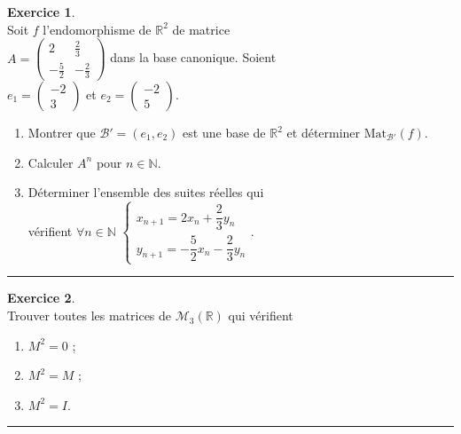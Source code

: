\documentclass[a4paper,10pt]{article}
\theoremstyle{definition}
\theoremstyle{definition}
\newtheorem{exo}{Exercice}
\newcommand{\R}{\mathbb{R}}
\newcommand{\N}{\mathbb{N}}
\begin{document}
\begin{minipage}{1\linewidth}
\begin{minipage}[t]{0.48\linewidth}
		\begin{exo}\quad\\
			Soit $f$ l'endomorphisme de $\R^2$ de matrice\\[0.25cm] $A=\begin{pmatrix} 2&\frac 23\\[0.25cm]
			-\frac 52&-\frac 23 \end{pmatrix}$ dans la base canonique. Soient\\[0.25cm] 
			$e_1 = \begin{pmatrix} -2 \\ 3\end{pmatrix}$
			et $e_2 = \begin{pmatrix} -2 \\ 5 \end{pmatrix}$.
			\begin{enumerate}
				\item Montrer que $\mathcal{B}'= (e_1, e_2)$ est une base de $\R^2$ et déterminer 
				$\text{Mat}_{\mathcal{B}'}(f)$.
				\item Calculer $A^n$ pour $n \in \N$.
				\item Déterminer l'ensemble des suites réelles qui \\[0.25cm]vérifient $\forall n \in \N$
				$\begin{cases} x_{n + 1} = 2x_n + \dfrac 23 y_n \\ y_{n + 1} = -\dfrac 52 x_n -
				\dfrac 23 y_n \end{cases}$.\\[0.25cm]
			\end{enumerate}
			
			
			\centering
			\rule{1\linewidth}{0.6pt}
		\end{exo}
		
		\begin{exo}\quad\\
			Trouver toutes les matrices de $\mathcal{M}_3(\R)$ qui vérifient
			\begin{enumerate}
				\item $M^2 = 0$ ;
				\item $M^2 = M$ ; 
				\item $M^2 = I$. 
			\end{enumerate}
			
			\centering
			\rule{1\linewidth}{0.6pt}
		\end{exo}

		
		
		
	\end{minipage}
\end{minipage}
\end{document}
